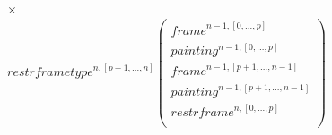 \documentclass{article}
\newcommand{\myframe}{\mathit{frame}}
\newcommand{\painting}{\mathit{painting}}
\newcommand{\restrframe}{\mathit{restrframe}}
\newcommand{\restrframetype}{\mathit{restrframetype}}
\begin{document}
\begin{enumerate}
$$\begin{array}{llcl}
\begin{array}{l}
                                \times \\
                                \restrframetype^{n,[p+1,...,n]}
                                \left(\begin{array}{l}
                                    \myframe^{n-1,[0,...,p]}  \\
                                    \painting^{n-1,[0,...,p]} \\
                                    \myframe^{n-1,[p+1,...,n-1]}  \\
                                    \painting^{n-1,[p+1,...,n-1]} \\
                                    \restrframe^{n,[0,...,p]} \\
                                  \end{array}\right)
                                \end{array}
          \end{array}
        $$



\end{enumerate}
\end{document}
